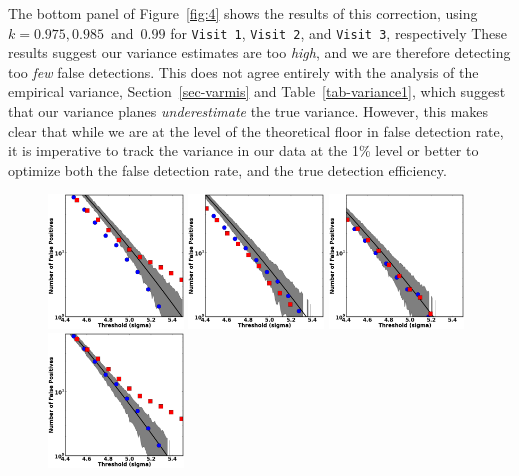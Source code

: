\documentclass[floatfix, apj]{emulateapj}
\begin{document}
The bottom panel of Figure~\ref{fig:4} shows the results of this correction, using $k = 0.975, 0.985 $~and~$ 0.99$ for {\tt Visit 1}, {\tt Visit 2}, and {\tt Visit 3}, respectively
These results suggest our variance estimates are too {\it high}, and we are therefore detecting too {\it few} false detections.
This does not agree entirely with the analysis of the empirical variance, Section~\ref{sec-varmis} and Table~\ref{tab-variance1}, which suggest that our variance planes {\it underestimate} the true variance.
However, this makes clear that while we are at the level of the theoretical floor in false detection rate, it is imperative to track the variance in our data at the 1\% level or better to optimize both the false detection rate, and the true detection efficiency.
\begin{figure}[!ht]
  \centering
  \includegraphics[width=0.32\textwidth]{fig4a.eps}
  \includegraphics[width=0.32\textwidth]{fig4b.eps}
  \includegraphics[width=0.32\textwidth]{fig4c.eps} \\
  \includegraphics[width=0.32\textwidth]{fig4d.eps}

\end{figure}
\end{document}

